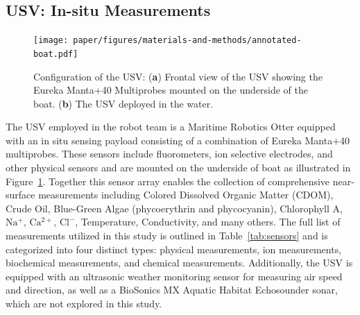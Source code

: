 \documentclass[remotesensing,article,submit,pdftex,moreauthors]{Definitions/mdpi}
\begin{document}
\subsection{USV: In-situ Measurements}

\begin{figure}[t!]
\texttt{[image: paper/figures/materials-and-methods/annotated-boat.pdf]}
\caption{ Configuration of the USV: (\textbf{a}) Frontal view of the USV showing the Eureka Manta+40 Multiprobes mounted on the underside of the boat. (\textbf{b}) The USV deployed in the water.\label{fig:boat-components}}
\end{figure} 

The USV employed in the robot team is a Maritime Robotics Otter equipped with an in situ sensing payload consisting of a combination of Eureka Manta+40 multiprobes. These sensors include fluorometers, ion selective electrodes, and other physical sensors and are mounted on the underside of boat as illustrated in Figure~\ref{fig:boat-components}. Together this sensor array enables the collection of comprehensive near-surface measurements including Colored Dissolved Organic Matter (CDOM), Crude Oil, Blue-Green Algae (phycoerythrin and phycocyanin), Chlorophyll A, $\mathrm{Na^+}$, $\mathrm{Ca^{2+}}$, $\mathrm{Cl^-}$, Temperature, Conductivity, and many others. The full list of measurements utilized in this study is outlined in Table~\ref{tab:sensors} and is categorized into four distinct types: physical measurements, ion measurements, biochemical measurements, and chemical measurements. Additionally, the USV is equipped with an ultrasonic weather monitoring sensor for measuring air speed and direction, as well as a BioSonics MX Aquatic Habitat Echosounder sonar, which are not explored in this study.

\end{document}
